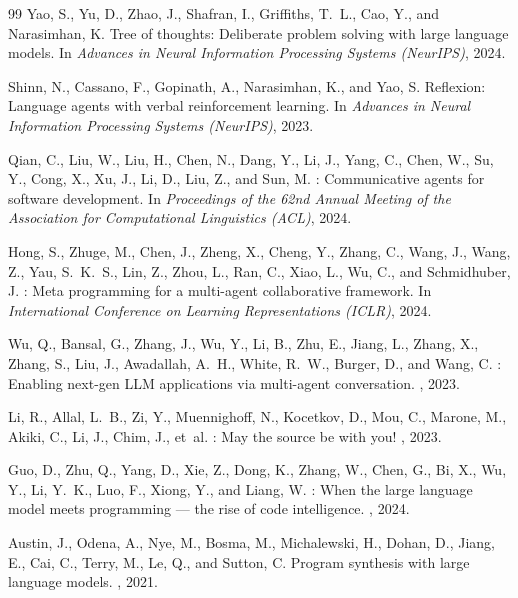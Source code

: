 \documentclass{article}
\begin{document}
{\begin{thebibliography}{99}
Yao, S., Yu, D., Zhao, J., Shafran, I., Griffiths, T.~L.,
Cao, Y., and Narasimhan, K.
\newblock Tree of thoughts: Deliberate problem solving with large
  language models.
\newblock In {\em Advances in Neural Information Processing Systems
  (NeurIPS)}, 2024.

Shinn, N., Cassano, F., Gopinath, A., Narasimhan, K., and Yao, S.
\newblock Reflexion: Language agents with verbal reinforcement
  learning.
\newblock In {\em Advances in Neural Information Processing Systems
  (NeurIPS)}, 2023.

Qian, C., Liu, W., Liu, H., Chen, N., Dang, Y., Li, J., Yang, C.,
Chen, W., Su, Y., Cong, X., Xu, J., Li, D., Liu, Z., and Sun, M.
: Communicative agents for software development.
\newblock In {\em Proceedings of the 62nd Annual Meeting of the
  Association for Computational Linguistics (ACL)}, 2024.

Hong, S., Zhuge, M., Chen, J., Zheng, X., Cheng, Y., Zhang, C.,
Wang, J., Wang, Z., Yau, S.~K.~S., Lin, Z., Zhou, L., Ran, C.,
Xiao, L., Wu, C., and Schmidhuber, J.
: Meta programming for a multi-agent collaborative
  framework.
\newblock In {\em International Conference on Learning
  Representations (ICLR)}, 2024.

Wu, Q., Bansal, G., Zhang, J., Wu, Y., Li, B., Zhu, E., Jiang, L.,
Zhang, X., Zhang, S., Liu, J., Awadallah, A.~H., White, R.~W.,
Burger, D., and Wang, C.
: Enabling next-gen {LLM} applications via
  multi-agent conversation.
, 2023.

Li, R., Allal, L.~B., Zi, Y., Muennighoff, N., Kocetkov, D.,
Mou, C., Marone, M., Akiki, C., Li, J., Chim, J., et~al.
: May the source be with you!
,
  2023.

Guo, D., Zhu, Q., Yang, D., Xie, Z., Dong, K., Zhang, W.,
Chen, G., Bi, X., Wu, Y., Li, Y.~K., Luo, F., Xiong, Y., and
Liang, W.
: When the large language model meets
  programming --- the rise of code intelligence.
, 2024.

Austin, J., Odena, A., Nye, M., Bosma, M., Michalewski, H.,
Dohan, D., Jiang, E., Cai, C., Terry, M., Le, Q., and Sutton, C.
\newblock Program synthesis with large language models.
, 2021.


\end{thebibliography}}
\end{document}
